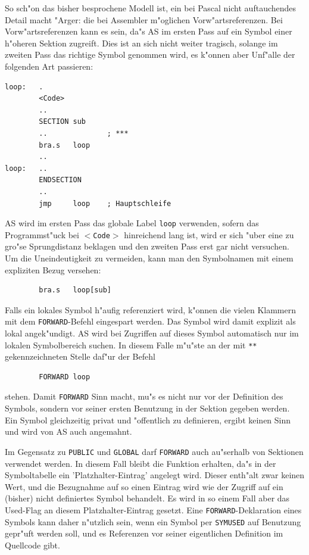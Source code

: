 \documentclass[12pt,a4paper,twoside]{report}
\newcommand{\tty}[1]{{\tt #1}}
\newcommand{\asname}{AS}
\begin{document}
So sch"on das bisher besprochene Modell ist, ein bei Pascal nicht
auftauchendes Detail macht "Arger: die bei Assembler m"oglichen
Vorw"artsreferenzen.  Bei Vorw"artsreferenzen kann es sein, da"s \asname{}
im ersten Pass auf ein Symbol einer h"oheren Sektion zugreift.  Dies
ist an sich nicht weiter tragisch, solange im zweiten Pass das richtige
Symbol genommen wird, es k"onnen aber Unf"alle der folgenden Art passieren:
\begin{verbatim}
loop:   .
        <Code>
        ..
        SECTION sub
        ..              ; ***
        bra.s   loop
        ..
loop:   ..
        ENDSECTION
        ..
        jmp     loop    ; Hauptschleife
\end{verbatim}
\asname{} wird im ersten Pass das globale Label \tty{loop} verwenden, sofern
das Programmst"uck bei \tty{$<$Code$>$} hinreichend lang ist, wird er
sich "uber eine zu gro"se Sprungdistanz beklagen und den zweiten Pass erst
gar nicht versuchen.  Um die Uneindeutigkeit zu vermeiden, kann man den
Symbolnamen mit einem expliziten Bezug versehen:
\begin{verbatim}
        bra.s   loop[sub]
\end{verbatim}
Falls ein lokales Symbol h"aufig referenziert wird, k"onnen die vielen
Klammern mit dem \tty{FORWARD}-Befehl eingespart werden.  Das Symbol
wird damit explizit als lokal angek"undigt.  \asname{} wird bei Zugriffen
auf dieses Symbol automatisch nur im lokalen Symbolbereich suchen.
In diesem Falle m"u"ste an der mit \tty{***} gekennzeichneten Stelle
daf"ur der Befehl
\begin{verbatim}
        FORWARD loop
\end{verbatim}
stehen.
Damit \tty{FORWARD} Sinn macht, mu"s es nicht nur vor der Definition des
Symbols, sondern vor seiner ersten Benutzung in der Sektion gegeben werden.
Ein Symbol gleichzeitig privat und "offentlich zu definieren, ergibt keinen
Sinn und wird von \asname{} auch angemahnt.

Im Gegensatz zu \tty{PUBLIC} und \tty{GLOBAL} darf \tty{FORWARD} auch
au"serhalb von Sektionen verwendet werden.  In diesem Fall bleibt die
Funktion erhalten, da"s in der Symboltabelle ein 'Platzhalter-Eintrag'
angelegt wird.  Dieser enth"alt zwar keinen Wert, und die Bezugnahme auf
so einen Eintrag wird wie der Zugriff auf ein (bisher) nicht definiertes
Symbol behandelt.  Es wird in so einem Fall aber das Used-Flag an diesem
Platzhalter-Eintrag gesetzt.  Eine \tty{FORWARD}-Deklaration eines
Symbols kann daher n"utzlich sein, wenn ein Symbol per \tty{SYMUSED} auf
Benutzung gepr"uft werden soll, und es Referenzen vor seiner eigentlichen
Definition im Quellcode gibt.
\end{document}
